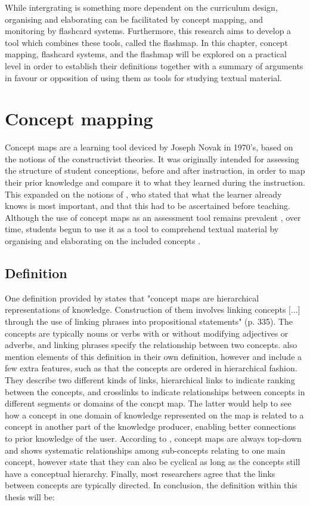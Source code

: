 While intergrating is something more dependent on the curriculum design, organising and elaborating can be facilitated by concept mapping, and monitoring by flashcard systems. Furthermore, this research aims to develop a tool which combines these tools, called the flashmap. In this chapter, concept mapping, flashcard systems, and the flashmap will be explored on a practical level in order to establish their definitions together with a summary of arguments in favour or opposition of using them as tools for studying textual material.

\section{Concept mapping}

Concept maps are a learning tool deviced by Joseph Novak in 1970's, based on the notions of the constructivist theories. It was originally intended for assessing the structure of student conceptions, before and after instruction, in order to map their prior knowledge and compare it to what they learned during the instruction. This expanded on the notions of , who stated that what the learner already knows is most important, and that this had to be ascertained before teaching. Although the use of concept maps as an assessment tool remains prevalent \cite{canas, chung, hwang2, ruiz1}, over time, students begun to use it as a tool to comprehend textual material by organising and elaborating on the included concepts \cite{canas, eppler, hwang2, karpicke2, nesbit2}.

\subsection{Definition}

One definition provided by  states that "concept maps are hierarchical representations of knowledge. Construction of them involves linking concepts [...] through the use of linking phrases into propositional statements" (p. 335). The concepts are typically nouns or verbs with or without modifying adjectives or adverbs, and linking phrases specify the relationship between two concepts.  also mention elements of this definition in their own definition, however  and  include a few extra features, such as that the concepts are ordered in hierarchical fashion. They describe two different kinds of links, hierarchical links to indicate ranking between the concepts, and crosslinks to indicate relationships between concepts in different segments or domains of the concpt map. The latter would help to see how a concept in one domain of knowledge represented on the map is related to a concept in another part of the knowledge producer, enabling better connections to prior knowledge of the user. According to , concept maps are always top-down and shows systematic relationships among sub-concepts relating to one main concept, however  state that they can also be cyclical as long as the concepts still have a conceptual hierarchy. Finally, most researchers agree that the links between concepts are typically directed. In conclusion, the definition within this thesis will be:

